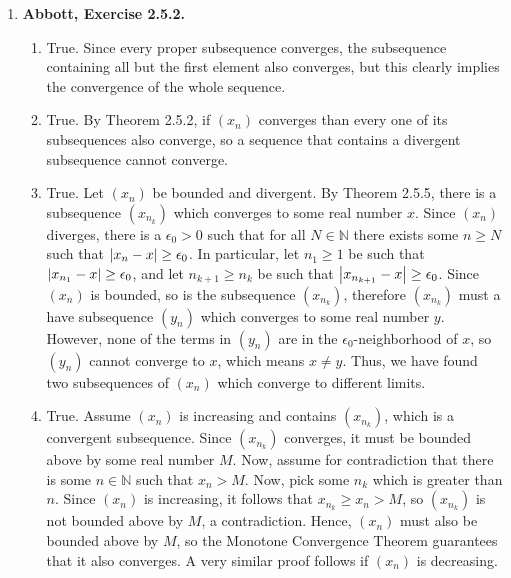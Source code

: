 \documentclass{article}
\DeclarePairedDelimiter\abs{\lvert}{\rvert}
\newcommand{\N}{\mathbb{N}}
\newcommand{\exc}[2][Abbott]{\item \textbf{#1, Exercise #2.}}
\begin{document}
\begin{enumerate}
    \exc{2.5.2}
    \begin{enumerate}
        \item True. Since every proper subsequence converges, the subsequence containing all but the first element also converges, but this clearly implies the convergence of the whole sequence.
        
        \item True. By Theorem 2.5.2, if $(x_n)$ converges than every one of its subsequences also converge, so a sequence that contains a divergent subsequence cannot converge.
        
        \item True. Let $(x_n)$ be bounded and divergent. By Theorem 2.5.5, there is a subsequence $(x_{n_k})$ which converges to some real number $x$. Since $(x_n)$ diverges, there is a $\epsilon_0 > 0$ such that for all $N \in \N$ there exists some $n \geq N$ such that $\abs*{x_n-x} \geq \epsilon_0$. In particular, let $n_1 \geq 1$ be such that $\abs*{x_{n_1}-x} \geq \epsilon_0$, and let $n_{k+1} \geq n_k$ be such that $\abs*{x_{n_{k+1}} - x} \geq \epsilon_0$. Since $(x_n)$ is bounded, so is the subsequence $(x_{n_k})$, therefore $(x_{n_k})$ must a have subsequence $(y_n)$ which converges to some real number $y$. However, none of the terms in $(y_n)$ are in the $\epsilon_0$-neighborhood of $x$, so $(y_n)$ cannot converge to $x$, which means $x \neq y$. Thus, we have found two subsequences of $(x_n)$ which converge to different limits.
        
        \item True. Assume $(x_n)$ is increasing and contains $(x_{n_k})$, which is a convergent subsequence. Since $(x_{n_k})$ converges, it must be bounded above by some real number $M$. Now, assume for contradiction that there is some $n \in \N$ such that $x_n > M$. Now, pick some $n_k$ which is greater than $n$. Since $(x_n)$ is increasing, it follows that $x_{n_k} \geq x_n > M$, so $(x_{n_k})$ is not bounded above by $M$, a contradiction. Hence, $(x_n)$ must also be bounded above by $M$, so the Monotone Convergence Theorem guarantees that it also converges. A very similar proof follows if $(x_n)$ is decreasing.
    \end{enumerate}
    

\end{enumerate}
\end{document}
